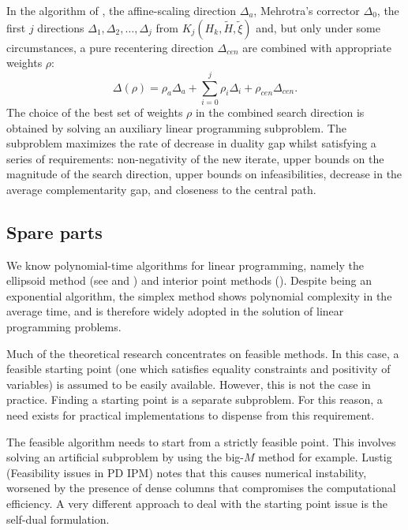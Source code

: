 In the algorithm of \cite{MehrotraLi}, the affine-scaling
direction $\Delta_a$, Mehrotra's corrector $\Delta_0$, 
the first $j$ directions $\Delta_1, \Delta_2, \dots, \Delta_j$ 
from $K_j (H_k, \tilde H, \tilde \xi)$ and, but only under some 
circumstances, a pure recentering direction $\Delta_{cen}$ are 
combined with appropriate weights $\rho$:
\[
\Delta(\rho) = \rho_a\Delta_a + \sum_{i=0}^j \rho_i \Delta_i 
             + \rho_{cen}\Delta_{cen}.
\]
The choice of the best set of weights $\rho$ in the combined search 
direction is obtained by solving an auxiliary linear programming 
subproblem. The subproblem maximizes the rate of decrease 
in duality gap whilst satisfying a series of requirements:
non-negativity of the new iterate,
upper bounds on the magnitude of the search direction,
upper bounds on infeasibilities,
decrease in the average complementarity gap,
and closeness to the central path.


%
%
\subsection{Spare parts}

We know polynomial-time algorithms for linear programming, 
namely the ellipsoid method (see \cite[ch.~13]{ip:Schrijver86} 
and \cite[ch.~I.6]{ip:NemhauserWolsey88}) and interior point 
methods (\cite{ipm:Wright97}). Despite being an exponential 
algorithm, the simplex method shows polynomial complexity in 
the average time, and is therefore widely adopted in the 
solution of linear programming problems.

\hrulefill

Much of the theoretical research concentrates on feasible 
methods. In this case, a feasible starting point (one which 
satisfies equality constraints and positivity of variables) 
is assumed to be easily available. However, this is not the 
case in practice. Finding a starting point is a separate 
subproblem. For this reason, a need exists for practical 
implementations to dispense from this requirement.

The feasible algorithm needs to start from a strictly feasible 
point. This involves solving an artificial subproblem by using 
the big-$M$ method for example. Lustig (Feasibility issues in 
PD IPM) notes that this causes numerical instability, worsened 
by the presence of dense columns that compromises the 
computational efficiency. A very different approach to deal 
with the starting point issue is the self-dual formulation.

